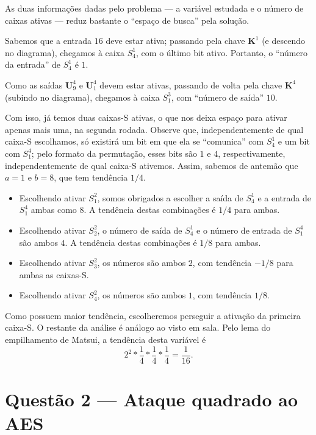 \documentclass{article}
\newcommand{\U}{\textbf{U}}
\newcommand{\K}{\textbf{K}}
\begin{document}
As duas informações dadas pelo problema
--- a variável estudada e o número de caixas ativas ---
reduz bastante o ``espaço de busca'' pela solução.

Sabemos que a entrada $16$ deve estar ativa;
passando pela chave $\K^1$ (e descendo no diagrama),
chegamos à caixa $S_4^1$,
com o último bit ativo.
Portanto, o ``número da entrada'' de $S_4^1$ é $1$.

Como as saídas $\U_9^4$ e $\U_1^4$ devem estar ativas,
passando de volta pela chave $\K^4$ (subindo no diagrama),
chegamos à caixa $S_1^3$, com ``número de saída'' $10$.

Com isso, já temos duas caixas-S ativas,
o que nos deixa espaço para ativar apenas mais uma,
na segunda rodada.
Observe que, independentemente de qual caixa-S escolhamos,
só existirá um bit em que ela se ``comunica'' com $S_4^1$
e um bit com $S_1^4$;
pelo formato da permutação, esses bits são $1$ e $4$,
respectivamente, independentemente de qual caixa-S ativemos.
Assim, sabemos de antemão que $a = 1$ e $b = 8$,
que tem tendência $1/4$.

\begin{itemize}
    \item Escolhendo ativar $S_1^2$,
        somos obrigados a escolher a saída de $S_4^1$
        e a entrada de $S_1^4$ ambas como $8$.
        A tendência destas combinações é $1/4$ para ambas.

    \item Escolhendo ativar $S_2^2$,
        o número de saída de $S_4^1$
        e o número de entrada de $S_1^4$ são ambos $4$.
        A tendência destas combinações é $1/8$ para ambas.

    \item Escolhendo ativar $S_3^2$,
        os números são ambos $2$, com tendência $-1/8$ para ambas as caixas-S.

    \item Escolhendo ativar $S_4^2$,
        os números são ambos $1$, com tendência $1/8$.
\end{itemize}

Como possuem maior tendência,
escolheremos perseguir a ativação da primeira caixa-S.
O restante da análise é análogo ao visto em sala.
Pelo lema do empilhamento de Matsui,
a tendência desta variável é
\begin{equation*}
    2^2 * \frac 1 4 * \frac 1 4 * \frac 1 4 = \frac 1 {16}.
\end{equation*}

\section{Questão 2 --- Ataque quadrado ao AES}
\end{document}
